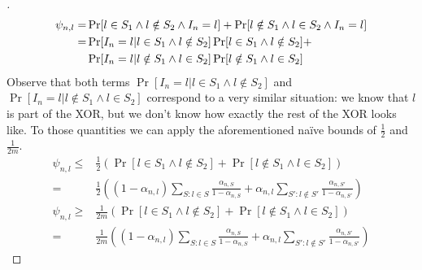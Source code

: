 \begin{proof}[]
  \begin{align}
    \psi_{n, l} =& \Pr[l \in S_1 \wedge l \notin S_2 \wedge I_n = l] + \Pr[l
        \notin S_1 \wedge l \in S_2 \wedge I_n = l] \\
    =& \Pr[I_n = l | l \in S_1 \wedge l \notin S_2] \Pr[l \in S_1 \wedge l
        \notin S_2] + \notag\\
    & \Pr[I_n = l | l \notin S_1 \wedge l \in S_2] \Pr[l \notin S_1 \wedge l
        \in S_2]
  \end{align}
  Observe that both terms $\Pr[I_n = l | l \in S_1 \wedge l \notin S_2]$ and
  $\Pr[I_n = l | l \notin S_1 \wedge l \in S_2]$ correspond to a very similar
  situation: we know that $l$ is part of the XOR, but we don't know how exactly
  the rest of the XOR looks like. To those quantities we can apply the
  aforementioned naïve bounds of $\frac{1}{2}$ and $\frac{1}{2m}$.
  \begin{align}
    \psi_{n, l} \leq& \frac{1}{2} (\Pr[l \in S_1 \wedge l \notin S_2] + \Pr[l
        \notin S_1 \wedge l \in S_2]) \\
      =& \frac{1}{2}((1 - \alpha_{n, l}) \sum_{S: l \in S} \frac{\alpha_{n,
          S}}{1 - \alpha_{n, S}} + \alpha_{n, l} \sum_{S': l \notin S'}
          \frac{\alpha_{n, S'}}{1 - \alpha_{n, S'}}) \\
    \psi_{n, l} \geq& \frac{1}{2m} (\Pr[l \in S_1 \wedge l \notin S_2] + \Pr[l
        \notin S_1 \wedge l \in S_2]) \\
      =& \frac{1}{2m}((1 - \alpha_{n, l}) \sum_{S: l \in S} \frac{\alpha_{n,
          S}}{1 - \alpha_{n, S}} + \alpha_{n, l} \sum_{S': l \notin S'}
          \frac{\alpha_{n, S'}}{1 - \alpha_{n, S'}})
  \end{align}
\end{proof}


